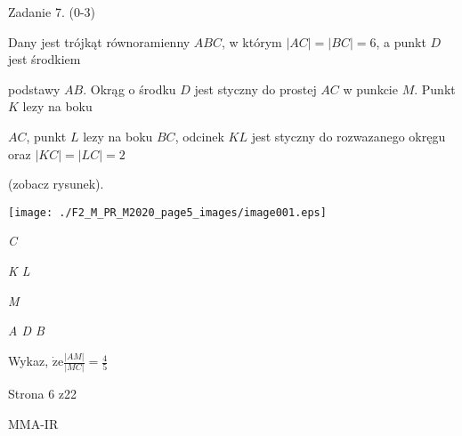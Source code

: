 \documentclass[a4paper,12pt]{article}
\begin{document}
Zadanie 7. (0-3)

Dany jest trójkąt równoramienny $ABC$, w którym $|AC|=|BC|=6$, a punkt $D$ jest środkiem

podstawy $AB$. Okrąg o środku $D$ jest styczny do prostej $AC$ w punkcie $M$. Punkt $K$ lezy na boku

$AC$, punkt $L$ lezy na boku $BC$, odcinek $KL$ jest styczny do rozwazanego okręgu oraz $|KC|=|LC|=2$

(zobacz rysunek).
\begin{center}
\texttt{[image: ./F2\_M\_PR\_M2020\_page5\_images/image001.eps]}
\end{center}
{\it C}

{\it K  L}

{\it M}

{\it A  D  B}

Wykaz, $\displaystyle \dot{\mathrm{z}}\mathrm{e}\frac{|AM|}{|MC|}=\frac{4}{5}$

Strona 6 z22

MMA-IR
\end{document}
